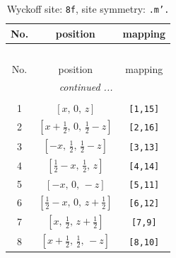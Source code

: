 \documentclass[fleqn,8pt]{jsarticle}
\begin{document}
\begin{longtable}{ccc}
\caption{Wyckoff site: {\tt 8f}, site symmetry: {\tt .m'.}}
 \\
 \hline \hline
No. & position & mapping \\ \hline \endfirsthead

\multicolumn{2}{l}{\tablename\ \thetable{}} \\
 \hline \hline
No. & position & mapping \\ \hline \endhead

 \hline \hline
\multicolumn{2}{r}{\footnotesize\it continued ...} \\ \endfoot

 \hline \hline
\multicolumn{2}{r}{} \\ \endlastfoot

1 & $\left[ x,\, 0,\, z \right]$ & {\tt [1,15]} \\ \hline
2 & $\left[ x + \frac{1}{2},\, 0,\, \frac{1}{2} - z \right]$ & {\tt [2,16]} \\ \hline
3 & $\left[ - x,\, \frac{1}{2},\, \frac{1}{2} - z \right]$ & {\tt [3,13]} \\ \hline
4 & $\left[ \frac{1}{2} - x,\, \frac{1}{2},\, z \right]$ & {\tt [4,14]} \\ \hline
5 & $\left[ - x,\, 0,\, - z \right]$ & {\tt [5,11]} \\ \hline
6 & $\left[ \frac{1}{2} - x,\, 0,\, z + \frac{1}{2} \right]$ & {\tt [6,12]} \\ \hline
7 & $\left[ x,\, \frac{1}{2},\, z + \frac{1}{2} \right]$ & {\tt [7,9]} \\ \hline
8 & $\left[ x + \frac{1}{2},\, \frac{1}{2},\, - z \right]$ & {\tt [8,10]} \\
\end{longtable}
\renewcommand{\arraystretch}{1.2}
\end{document}
